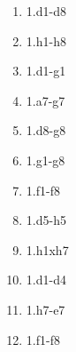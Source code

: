 \begin{enumerate}
\setcounter{enumi}{\value{d_counter}}
\item 1.\rook{}d1-d8\mate{}
\item 1.\rook{}h1-h8\mate{}
\item 1.\rook{}d1-g1\mate{}
\item 1.\rook{}a7-g7\mate{}
\item 1.\rook{}d8-g8\mate{}
\item 1.\rook{}g1-g8\mate{}

\item 1.\rook{}f1-f8\mate{}
\item 1.\rook{}d5-h5\mate{}
\item 1.\rook{}h1xh7\mate{}
\item 1.\rook{}d1-d4\mate{}
\item 1.\rook{}h7-e7\mate{}
\item 1.\rook{}f1-f8\mate{}
\setcounter{d_counter}{\value{enumi}}
\end{enumerate}